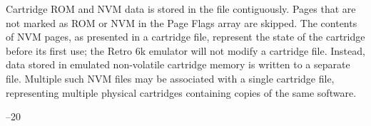 \documentclass[12pt]{{memoir}}
\begin{document}
Cartridge ROM and NVM data is stored in the file contiguously. Pages that are not marked as ROM or NVM in the Page Flags array are skipped. The contents of NVM pages, as presented in a cartridge file, represent the state of the cartridge before its first use; the Retro 6k emulator will not modify a cartridge file. Instead, data stored in emulated non-volatile cartridge memory is written to a separate file. Multiple such NVM files may be associated with a single cartridge file, representing multiple physical cartridges containing copies of the same software.

\cleartoverso
\pagestyle{empty}

\noindent\thetitle\hfill{}--20 \theauthor
\end{document}
